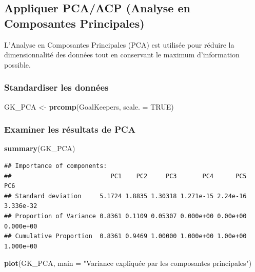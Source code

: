 \documentclass[
  6pt,
]{article}
\newenvironment{Shaded}{\begin{snugshade}}{\end{snugshade}}
\newcommand{\AttributeTok}[1]{\textcolor[rgb]{0.13,0.29,0.53}{#1}}
\newcommand{\ConstantTok}[1]{\textcolor[rgb]{0.56,0.35,0.01}{#1}}
\newcommand{\FunctionTok}[1]{\textcolor[rgb]{0.13,0.29,0.53}{\textbf{#1}}}
\newcommand{\NormalTok}[1]{#1}
\newcommand{\OtherTok}[1]{\textcolor[rgb]{0.56,0.35,0.01}{#1}}
\newcommand{\StringTok}[1]{\textcolor[rgb]{0.31,0.60,0.02}{#1}}
\begin{document}
\subsection{Appliquer PCA/ACP (Analyse en Composantes
Principales)}\label{appliquer-pcaacp-analyse-en-composantes-principales}

L'Analyse en Composantes Principales (PCA) est utilisée pour réduire la
dimensionnalité des données tout en conservant le maximum d'information
possible.

\subsubsection{Standardiser les
données}\label{standardiser-les-donnuxe9es}

\begin{Shaded}
\begin{Highlighting}[]
\NormalTok{GK\_PCA }\OtherTok{\textless{}{-}} \FunctionTok{prcomp}\NormalTok{(GoalKeepers, }\AttributeTok{scale. =} \ConstantTok{TRUE}\NormalTok{)}
\end{Highlighting}
\end{Shaded}

\subsubsection{Examiner les résultats de
PCA}\label{examiner-les-ruxe9sultats-de-pca}

\begin{Shaded}
\begin{Highlighting}[]
\FunctionTok{summary}\NormalTok{(GK\_PCA)}
\end{Highlighting}
\end{Shaded}

\begin{verbatim}
## Importance of components:
##                           PC1    PC2     PC3       PC4      PC5       PC6
## Standard deviation     5.1724 1.8835 1.30318 1.271e-15 2.24e-16 3.336e-32
## Proportion of Variance 0.8361 0.1109 0.05307 0.000e+00 0.00e+00 0.000e+00
## Cumulative Proportion  0.8361 0.9469 1.00000 1.000e+00 1.00e+00 1.000e+00
\end{verbatim}

\begin{Shaded}
\begin{Highlighting}[]
\FunctionTok{plot}\NormalTok{(GK\_PCA, }\AttributeTok{main =} \StringTok{"Variance expliquée par les composantes principales"}\NormalTok{)}
\end{Highlighting}
\end{Shaded}
\end{document}
